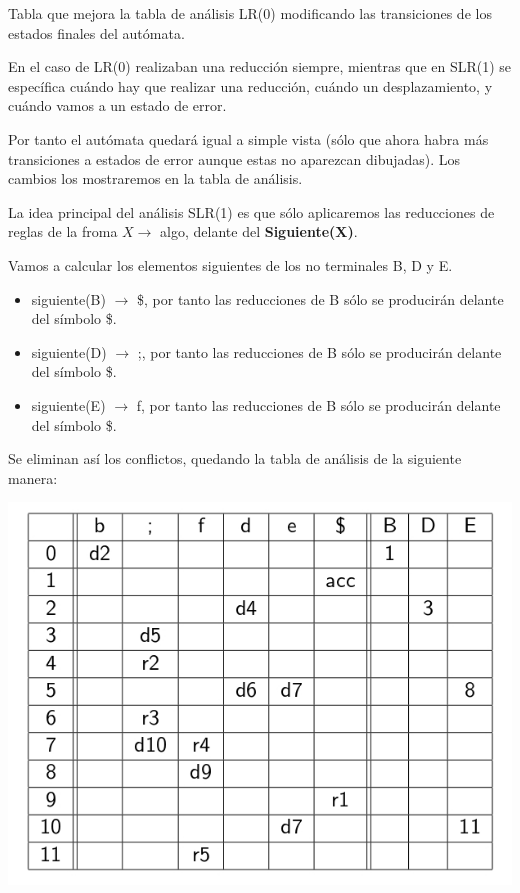 \documentclass{apuntes}
\begin{document}
\begin{defn}
Tabla que mejora la tabla de análisis LR(0) modificando las transiciones de los estados finales del autómata.

En el caso de LR(0) realizaban una reducción siempre, mientras que en SLR(1) se específica cuándo hay que realizar una reducción, cuándo un desplazamiento, y cuándo vamos a un estado de error.
\end{defn}

Por tanto el autómata quedará igual a simple vista (sólo que ahora habra más transiciones a estados de error aunque estas no aparezcan dibujadas). Los cambios los mostraremos en la tabla de análisis.

La idea principal del análisis SLR(1) es que sólo aplicaremos las reducciones de reglas de la froma $X \rightarrow $ algo, delante del \textbf{Siguiente(X)}.

Vamos a calcular los elementos siguientes de los no terminales B, D y E.

\begin{itemize}
\item siguiente(B) $\rightarrow$ {\$}, por tanto las reducciones de B sólo se producirán delante del símbolo \$.
\item siguiente(D) $\rightarrow$ {;}, por tanto las reducciones de B sólo se producirán delante del símbolo \$.
\item siguiente(E) $\rightarrow$ {f}, por tanto las reducciones de B sólo se producirán delante del símbolo \$.
\end{itemize}

Se eliminan así los conflictos, quedando la tabla de análisis de la siguiente manera:

\begin{center}
\includegraphics[scale=0.4]{img/tablaanalisisslr1.jpg}
\end{center}
\end{document}
